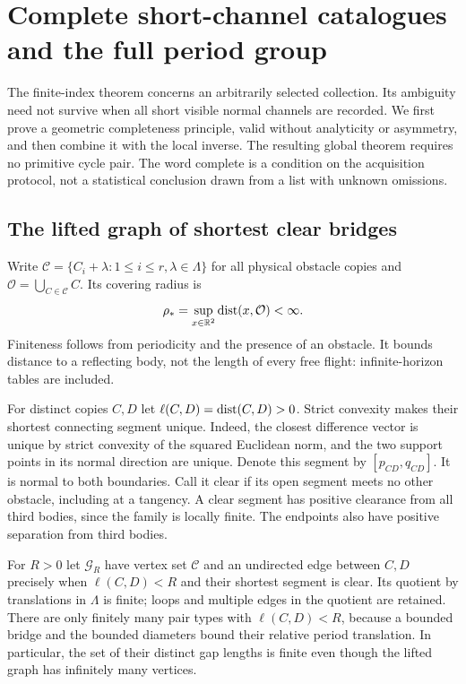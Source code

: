 \section{Complete short-channel catalogues and the full period group}
\label{sec:canonical}
The finite-index theorem concerns an arbitrarily selected collection.
Its ambiguity need not survive when all short visible normal channels
are recorded. We first prove a geometric completeness principle, valid
without analyticity or asymmetry, and then combine it with the local
inverse. The resulting global theorem requires no primitive cycle pair.
The word complete is a condition on the acquisition protocol, not a
statistical conclusion drawn from a list with unknown omissions.

\subsection{The lifted graph of shortest clear bridges}
Write $\mathcal C=\{C_i+\lambda:1\le i\le r,\lambda\in\Lambda\}$
for all physical obstacle copies and $\mathcal O=\bigcup_{C\in\mathcal C}C$.
Its covering radius is
\begin{equation}\label{eq:covering-radius}
 \rho_* =\sup_{x\in\mathbb R^2}\operatorname{dist}(x,\mathcal O)<\infty.
\end{equation}
Finiteness follows from periodicity and the presence of an obstacle.
It bounds distance to a reflecting body, not the length of every free
flight: infinite-horizon tables are included.

For distinct copies $C,D$ let $\ell(C,D)=\operatorname{dist}(C,D)>0$.
Strict convexity makes their shortest connecting segment unique.
Indeed, the closest difference vector is unique by strict convexity of
the squared Euclidean norm, and the two support points in its normal
direction are unique. Denote this segment by $[p_{CD},q_{CD}]$.
It is normal to both boundaries. Call it clear if its open segment meets
no other obstacle, including at a tangency. A clear segment has positive
clearance from all third bodies, since the family is locally finite.
The endpoints also have positive separation from third bodies.

For $R>0$ let $\mathcal G_R$ have vertex set $\mathcal C$ and an
undirected edge between $C,D$ precisely when $\ell(C,D)<R$ and their
shortest segment is clear. Its quotient by translations in $\Lambda$
is finite; loops and multiple edges in the quotient are retained.
There are only finitely many pair types with $\ell(C,D)<R$, because
a bounded bridge and the bounded diameters bound their relative period
translation. In particular, the set of their distinct gap lengths is
finite even though the lifted graph has infinitely many vertices.

